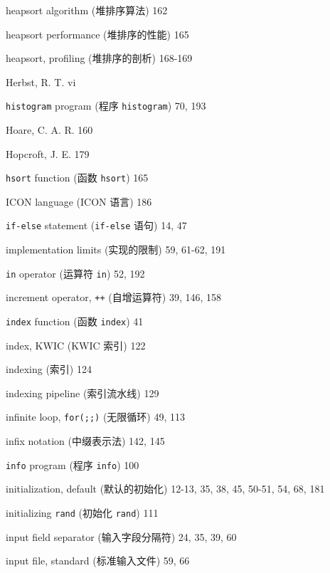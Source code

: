 \begin{multicols}{3}
\hangindent=3pc  heapsort algorithm (堆排序算法) 162

\hangindent=3pc  heapsort performance (堆排序的性能) 165

\hangindent=3pc  heapsort, profiling (堆排序的剖析) 168-169

\hangindent=3pc  Herbst, R. T. vi

\hangindent=3pc  \verb'histogram' program (程序
\verb'histogram') 70, 193

\hangindent=3pc  Hoare, C. A. R. 160

\hangindent=3pc  Hopcroft, J. E. 179

\hangindent=3pc  \verb'hsort' function (函数 \verb'hsort') 165

\hangindent=3pc  ICON language (ICON 语言) 186

\hangindent=3pc  \verb'if-else' statement (\verb'if-else' 语句) 14, 47

\hangindent=3pc  implementation limits (实现的限制) 59, 61-62, 191

\hangindent=3pc  \verb'in' operator (运算符 \verb'in') 52, 192

\hangindent=3pc  increment operator, \verb'++' (自增运算符) 39, 146, 158

\hangindent=3pc  \verb'index' function (函数 \verb'index') 41

\hangindent=3pc  index, KWIC (KWIC 索引) 122

\hangindent=3pc  indexing (索引) 124

\hangindent=3pc  indexing pipeline (索引流水线) 129

\hangindent=3pc  infinite loop, \verb'for(;;)' (无限循环) 49, 113

\hangindent=3pc  infix notation (中缀表示法) 142, 145

\hangindent=3pc  \verb'info' program (程序 \verb'info') 100

\hangindent=3pc  initialization, default (默认的初始化)
12-13, 35, 38, 45, 50-51, 54, 68, 181

\hangindent=3pc  initializing \verb'rand' (初始化 \verb'rand') 111

\hangindent=3pc  input field separator (输入字段分隔符) 24, 35, 39, 60

\hangindent=3pc  input file, standard (标准输入文件) 59, 66


\end{multicols}
